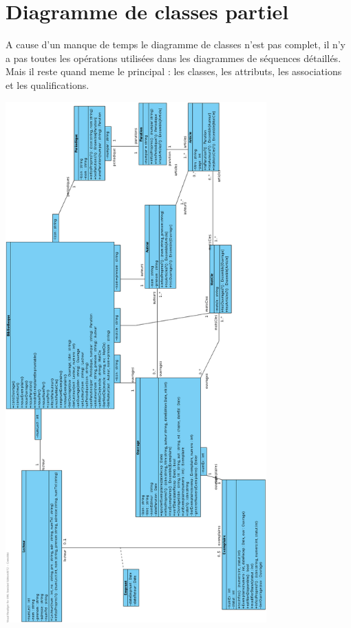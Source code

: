 \documentclass[a4paper,10pt]{report}
\begin{document}
\section*{Diagramme de classes partiel}
\bigskip
\bigskip
\begin{flushleft}
A cause d'un manque de temps le diagramme de classes n'est pas complet, il n'y a pas toutes les opérations utilisées dans les diagrammes de séquences détaillés. Mais il reste quand meme le principal : les classes, les attributs, les associations et les qualifications.\\
\end{flushleft}
\includegraphics[height=200mm]{diagrammeDeClassePartiel.png}
\end{document}
